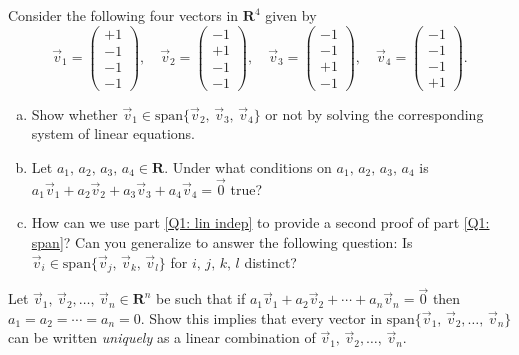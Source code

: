 \documentclass[a4paper,11pt]{article}
\newcommand{\R}{\mathbf{R}}
\begin{document}
 Consider the following four vectors in $\R^4$
given by
\[
  \vec v_1 = \begin{pmatrix}+1 \\ -1 \\ -1 \\ -1\end{pmatrix},  \quad
  \vec v_2 = \begin{pmatrix}-1 \\ +1 \\ -1 \\ -1\end{pmatrix}, \quad
  \vec v_3 = \begin{pmatrix}-1 \\ -1 \\ +1 \\ -1\end{pmatrix}, \quad
  \vec v_4 = \begin{pmatrix}-1 \\ -1 \\ -1 \\ +1\end{pmatrix}.
\]
\begin{enumerate}[(a)]
\item\label{Q1: span} Show whether $\vec v_1 \in \text{span}\{\vec v_2,\,\vec
  v_3,\,\vec v_4\}$ 
  or not by solving the corresponding system of linear equations.
\item\label{Q1: lin indep} Let $a_1,\,a_2,\,a_3,\,a_4 \in \R$. Under what
  conditions on $a_1,\,a_2,\,a_3,\,a_4$ is $a_1\vec v_1+a_2\vec v_2+a_3\vec
  v_3+a_4\vec v_4=\vec{0}$ true?
\item How can we use part \ref{Q1: lin indep} to provide a second proof of part
  \ref{Q1: span}? Can you generalize to answer the following question: Is $\vec
  v_i \in \text{span}\{\vec v_j,\,\vec v_k,\,\vec v_l\}$ for $i,\,j,\,k,\,l$
  distinct? \\
\end{enumerate}

 Let $\vec v_1,\,\vec v_2,\dots,\,\vec v_n \in
\R^n$ be such that if $a_1\vec v_1 + a_2\vec v_2 + \cdots + a_n\vec v_n=\vec 0$
then $a_1=a_2=\cdots=a_n=0$. Show this implies that every vector in
$\text{span}\{\vec v_1,\,\vec v_2,\dots,\,\vec v_n\}$ can be written {\it
  uniquely} as a linear combination of $\vec v_1,\,\vec v_2,\dots,\,\vec v_n$. \\
\end{document}
